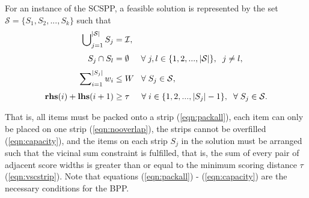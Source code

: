\documentclass[oribibl]{llncs}
\begin{document}
For an instance of the SCSPP, a feasible solution is represented by the set $\mathcal{S} = \{S_1, S_2, ..., S_k\}$ such that
\begin{subequations}
	\begin{align}
		\bigcup\nolimits_{j=1}^{|\mathcal{S}|} S_j &= \mathcal{I}, \label{eqn:packall}\\[3pt]
		S_j \cap S_l &= \emptyset \hspace{5mm} \forall \hspace{1mm} j, l \in \{1, 2, ..., |\mathcal{S}|\}, \hspace{2mm} j \neq l, \label{eqn:nooverlap} \\[3pt]
		\sum\nolimits_{i=1}^{|S_j|}w_i & \leq W \hspace{3mm} \forall \hspace{1mm} S_j \in \mathcal{S}, \label{eqn:capacity} \\[3pt]
		\textup{\textbf{rhs}}(i) + \textup{\textbf{lhs}}(i+1) &\geq \tau \hspace {5mm} \forall \hspace{1mm} i \in \{1, 2, ..., |S_j|-1\}, \hspace{2mm} \forall \hspace{1mm} S_j \in \mathcal{S}. \label{eqn:vscstrip}
\end{align}
\end{subequations}

That is, all items must be packed onto a strip (\ref{eqn:packall}), each item can only be placed on one strip (\ref{eqn:nooverlap}), the strips cannot be overfilled (\ref{eqn:capacity}), and the items on each strip $S_j$ in the solution must be arranged such that the vicinal sum constraint is fulfilled, that is, the sum of every pair of adjacent score widths is greater than or equal to the minimum scoring distance $\tau$ (\ref{eqn:vscstrip}). Note that equations (\ref{eqn:packall}) - (\ref{eqn:capacity}) are the necessary conditions for the BPP. 
\end{document}
